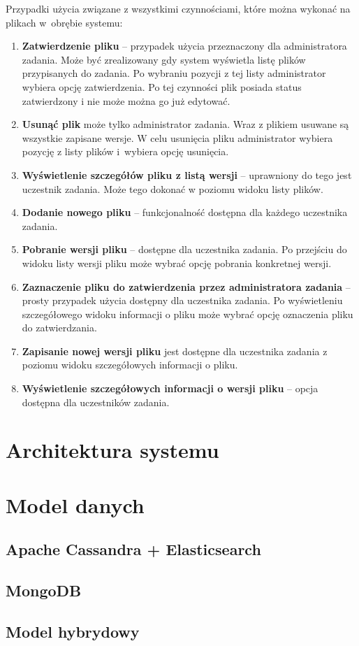 Przypadki użycia związane z wszystkimi czynnościami, które można wykonać na plikach w~obrębie systemu:
\begin{enumerate}
    \item \textbf{Zatwierdzenie pliku} -- przypadek użycia przeznaczony dla administratora zadania. 
    Może być zrealizowany gdy system wyświetla listę plików przypisanych do zadania. 
    Po wybraniu pozycji z tej listy administrator wybiera opcję zatwierdzenia. 
    Po tej czynności plik posiada status zatwierdzony i nie może można go już edytować.
    \item  \textbf{Usunąć plik} może tylko administrator zadania. 
    Wraz z plikiem usuwane są wszystkie zapisane wersje. 
    W celu usunięcia pliku administrator wybiera pozycję z listy plików i~wybiera opcję usunięcia.
    \item \textbf{Wyświetlenie szczegółów pliku z listą wersji} -- uprawniony do tego jest uczestnik zadania.
    Może tego dokonać w poziomu widoku listy plików.
    \item \textbf{Dodanie nowego pliku} -- funkcjonalność dostępna dla każdego uczestnika zadania. 
    \item \textbf{Pobranie wersji pliku} -- dostępne dla uczestnika zadania. 
    Po przejściu do widoku listy wersji pliku może wybrać opcję pobrania konkretnej wersji.
    \item \textbf{Zaznaczenie pliku do zatwierdzenia przez administratora zadania} -- prosty przypadek użycia dostępny dla uczestnika zadania.
    Po wyświetleniu  szczegółowego widoku informacji o pliku może wybrać opcję oznaczenia pliku do zatwierdzania.
    \item \textbf{Zapisanie nowej wersji pliku} jest dostępne dla uczestnika zadania z poziomu widoku szczegółowych informacji o pliku.
    \item \textbf{Wyświetlenie szczegółowych informacji o wersji pliku} -- opcja dostępna dla uczestników zadania.
\end{enumerate}

\section{Architektura systemu}

\section{Model danych}

\subsection{Apache Cassandra + Elasticsearch}

\subsection{MongoDB}

\subsection{Model hybrydowy}